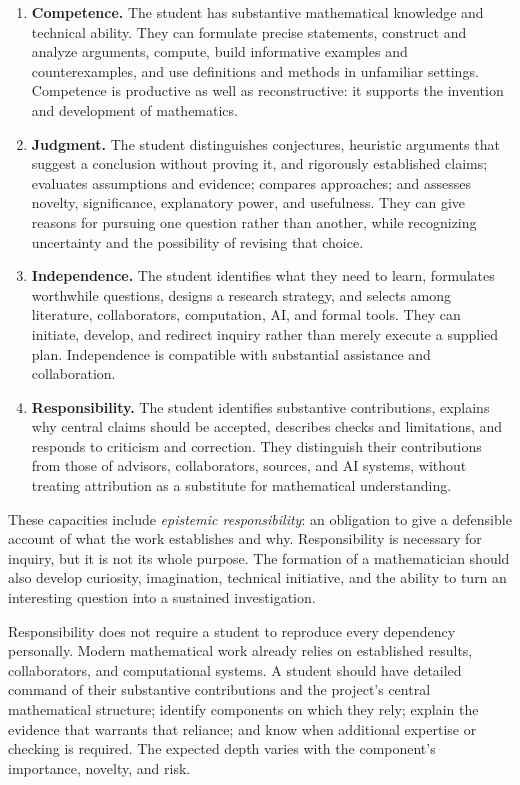 \documentclass[11pt]{article}
\newcommand{\term}[1]{\emph{#1}}
\begin{document}
\begin{enumerate}
    \item \textbf{Competence.} The student has substantive mathematical knowledge and
    technical ability. They can formulate precise statements, construct and analyze
    arguments, compute, build informative examples and counterexamples, and use
    definitions and methods in unfamiliar settings. Competence is productive as well
    as reconstructive: it supports the invention and development of mathematics.

    \item \textbf{Judgment.} The student distinguishes conjectures, heuristic arguments
    that suggest a conclusion without proving it, and rigorously established claims;
    evaluates assumptions and evidence; compares approaches;
    and assesses novelty, significance, explanatory power, and usefulness. They can
    give reasons for pursuing one question rather than another, while recognizing
    uncertainty and the possibility of revising that choice.

    \item \textbf{Independence.} The student identifies what they need to learn,
    formulates worthwhile questions, designs a research strategy, and selects among
    literature, collaborators, computation, AI, and formal tools. They can initiate,
    develop, and redirect inquiry rather than merely execute a supplied plan.
    Independence is compatible with substantial assistance and collaboration.

    \item \textbf{Responsibility.} The student identifies substantive contributions,
    explains why central claims should be accepted, describes checks and limitations,
    and responds to criticism and correction. They distinguish their contributions
    from those of advisors, collaborators, sources, and AI systems, without treating
    attribution as a substitute for mathematical understanding.
\end{enumerate}

These capacities include \term{epistemic responsibility}: an obligation to give a
defensible account of what the work establishes and why. Responsibility is necessary
for inquiry, but it is not its whole purpose. The formation of a mathematician should
also develop curiosity, imagination, technical initiative, and the ability to turn an
interesting question into a sustained investigation.

Responsibility does not require a student to reproduce every dependency personally.
Modern mathematical work already relies on established results, collaborators, and
computational systems. A student should have detailed command of their substantive
contributions and the project's central mathematical structure; identify components
on which they rely; explain the evidence that warrants that reliance; and know when
additional expertise or checking is required. The expected depth varies with the
component's importance, novelty, and risk.
\end{document}
